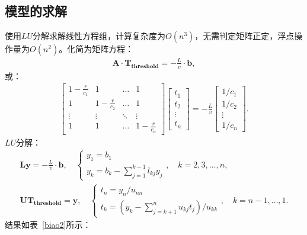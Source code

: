 \documentclass{whutmod}
\begin{document}
        \subsection{模型的求解}
            使用$LU$分解求解线性方程组，计算复杂度为$O(n^3)$，无需判定矩阵正定，浮点操作量为$O(n^2)$。化简为矩阵方程：
            \begin{gather}
                \bm{A} \cdot \bm{T_{threshold}} = -\frac{L}{v} \cdot \bm{b},
            \end{gather}
            或：
            \begin{gather}
                \begin{bmatrix}
                    1 - \frac{r}{c_1} & 1 & \dots & 1 \\
                    1 & 1 - \frac{r}{c_2} & \dots & 1 \\
                    \vdots & \vdots & \ddots & \vdots \\
                    1 & 1 & \dots & 1 - \frac{r}{c_n}
                \end{bmatrix}
                \begin{bmatrix}
                    t_1 \\ t_2 \\ \vdots \\ t_n
                \end{bmatrix}
                = -\frac{L}{v}
                \begin{bmatrix}
                    1/c_1 \\ 1/c_2 \\ \vdots \\ 1/c_n
                \end{bmatrix}.
            \end{gather}
            $LU$分解：
            \begin{gather}
                \bm{Ly} = -\frac{L}{v} \cdot \bm{b}, \quad
                \left\{
                \begin{matrix}
                    y_1 = b_1 \\
                    y_k = b_k - \sum_{j=1}^{k-1} l_{kj} y_j
                \end{matrix}
                \right., \quad k=2,3,\dots,n, \\
                \bm{U T_{threshold}} = \bm{y}, \quad
                \left\{
                \begin{matrix}
                    t_n = y_n / u_{nn} \\
                    t_k = (y_k - \sum_{j=k+1}^{n} u_{kj} t_j) / u_{kk}
                \end{matrix}
                \right., \quad k=n-1,\dots,1.
            \end{gather}
            结果如表~\ref{biao2}所示：
\end{document}
